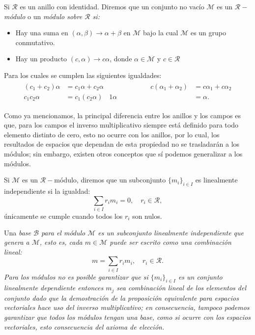 \begin{definition}[Módulo]
	Si $\mathcal{R}$ es un anillo con identidad. Diremos que un conjunto no vacío $\mathcal{M}$ es un \textit{$\mathcal{R}-$módulo} o un \it{módulo sobre $\mathcal{R}$} si:
	\begin{itemize}
		\item Hay una suma en $(\alpha,\beta) \to \alpha + \beta$ en $\mathcal{M}$ bajo la cual $\mathcal{M}$ es un grupo conmutativo.
		\item Hay un producto $(c,\alpha) \to c \alpha$, donde $\alpha \in \mathcal{M}$ y $c \in \mathcal{R}$
	\end{itemize}
	Para los cuales se cumplen las siguientes igualdades:
	\begin{gather*}
		\begin{alignedat}{2}
			(c_1 + c_2) \alpha                    & = c_1 \alpha + c_2 \alpha
			& \hspace{6em} c(\alpha_1 + \alpha_2) & = c\alpha_1 + c\alpha_2 \\
			c_1 c_2 \alpha                        & = c_1(c_2 \alpha)
			& 1 \alpha                            & = \alpha.
		\end{alignedat}
	\end{gather*}
\end{definition}
Como ya mencionamos, la principal diferencia entre los anillos y los campos es que, para los campos el inverso multiplicativo siempre está definido para todo elemento distinto de cero, esto no ocurre con los anillos, por lo cual, los resultados de espacios que dependan de esta propiedad no se trasladarán a los módulos; sin embargo, existen otros conceptos que sí podemos generalizar a los módulos.

\begin{definition}
	Si $\mathcal{M}$ es un $\mathcal{R}-$módulo, diremos que un subconjunto $\{m_i\}_{i \in I}$ es linealmente independiente si la igualdad:
	\[
		\sum_{i \in I} r_i m_i = 0, \quad r_i \in \mathcal{R},
	\]
	únicamente se cumple cuando todos los $r_i$ son nulos.

	Una \it{base} $\mathcal{B}$ para el módulo $\mathcal{M}$ es un subconjunto linealmente independiente que genera a $\mathcal{M}$, esto es, cada $m \in \mathcal{M}$ puede ser escrito como una combinación lineal:
	\[m = \sum_{i \in I} r_i m_i, \quad r_i \in \mathcal{R}.\]
	Para los módulos no es posible garantizar que si $\{m_i\}_{i \in I}$ es un conjunto linealmente dependiente entonces $m_j$ sea combinación lineal de los elementos del conjunto dado que la demostración de la proposición equivalente para espacios vectoriales hace uso del inverso multiplicativo; en consecuencia, tampoco podemos garantizar que todos los módulos tengan una base, como si ocurre con los espacios vectoriales, esto consecuencia del axioma de elección.
\end{definition}

